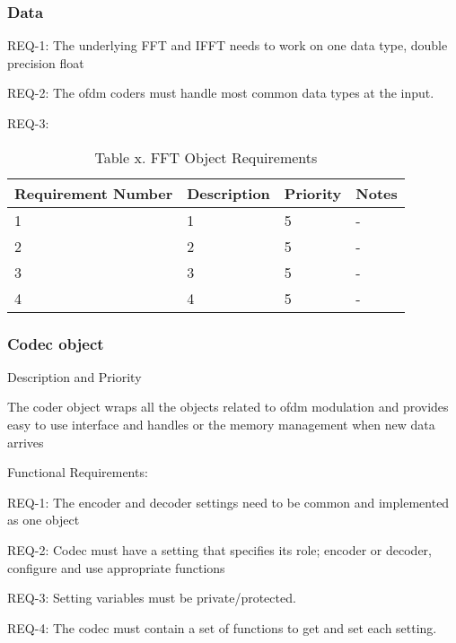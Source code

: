 \documentclass[]{report}
\begin{document}
\subsubsection{Data}

REQ-1: The underlying FFT and IFFT needs to work on one data type, double precision float \par
REQ-2: The ofdm coders must handle most common data types at the input. \par
REQ-3: \par



\begin{table}
	\centering
	
	\begin{tabular}{|l|l|l|l|} 
		\hline
		Requirement Number & Description & Priority & Notes  \\ 
		\hline
		1                  & 1           & 5        & -      \\ 
		\hline
		2                  & 2           & 5        & -      \\ 
		\hline
		3                  & 3           & 5        & -      \\ 
		\hline
		4                  & 4           & 5        & -      \\
		\hline
	\end{tabular}
	\caption{Table x. FFT Object Requirements}
\end{table}


\subsubsection{Codec object}

Description and Priority

The coder object wraps all the objects related to ofdm modulation and provides easy to use interface and handles or the memory management when new data arrives

Functional Requirements:

REQ-1: The encoder and decoder settings need to be common and implemented as one object \par
REQ-2: Codec must have a setting that specifies its role; encoder or decoder, configure and use appropriate functions \par
REQ-3: Setting variables must be private/protected. \par
REQ-4: The codec must contain a set of functions to get and set each setting. \par
\end{document}

